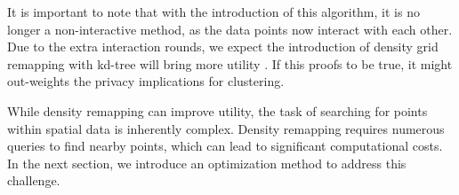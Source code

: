


It is important to note that with the introduction of this algorithm, it is no longer a non-interactive method, as the data points now interact with each other.
Due to the extra interaction rounds, we expect the introduction of density grid remapping with kd-tree will bring more utility \citep{wang_comprehensive_2020, xiongComprehensiveSurveyLocal2020}.
If this proofs to be true, it might out-weights the privacy implications for clustering.  \newline

While density remapping can improve utility, the task of searching for points within spatial data is inherently complex. Density remapping requires numerous queries to find nearby points, which can lead to significant computational costs. In the next section, we introduce an optimization method to address this challenge.

